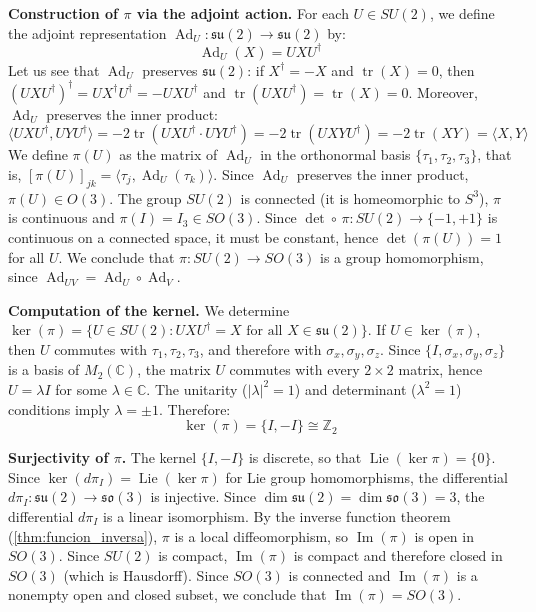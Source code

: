 \begin{example}
\textbf{Construction of $\pi$ via the adjoint action.}
For each $U \in SU(2)$, we define the adjoint representation $\operatorname{Ad}_U: \mathfrak{su}(2) \to \mathfrak{su}(2)$ by:
\begin{equation}\label{eq:adjoint_su2}
	\operatorname{Ad}_U(X) = UXU^\dagger
\end{equation}
Let us see that $\operatorname{Ad}_U$ preserves $\mathfrak{su}(2)$: if $X^\dagger = -X$ and $\operatorname{tr}(X) = 0$, then $(UXU^\dagger)^\dagger = UX^\dagger U^\dagger = -UXU^\dagger$ and $\operatorname{tr}(UXU^\dagger) = \operatorname{tr}(X) = 0$. Moreover, $\operatorname{Ad}_U$ preserves the inner product:
\[
	\langle UXU^\dagger, UYU^\dagger \rangle = -2\operatorname{tr}(UXU^\dagger \cdot UYU^\dagger) = -2\operatorname{tr}(UXYU^\dagger) = -2\operatorname{tr}(XY) = \langle X, Y \rangle
\]
We define $\pi(U)$ as the matrix of $\operatorname{Ad}_U$ in the orthonormal basis $\{\tau_1, \tau_2, \tau_3\}$, that is, $[\pi(U)]_{jk} = \langle \tau_j, \operatorname{Ad}_U(\tau_k) \rangle$. Since $\operatorname{Ad}_U$ preserves the inner product, $\pi(U) \in O(3)$. The group $SU(2)$ is connected (it is homeomorphic to $S^3$), $\pi$ is continuous and $\pi(I) = I_3 \in SO(3)$. Since $\det \circ\, \pi: SU(2) \to \{-1, +1\}$ is continuous on a connected space, it must be constant, hence $\det(\pi(U)) = 1$ for all $U$. We conclude that $\pi: SU(2) \to SO(3)$ is a group homomorphism, since $\operatorname{Ad}_{UV} = \operatorname{Ad}_U \circ \operatorname{Ad}_V$.

\textbf{Computation of the kernel.}
We determine $\ker(\pi) = \{U \in SU(2) : UXU^\dagger = X \text{ for all } X \in \mathfrak{su}(2)\}$. If $U \in \ker(\pi)$, then $U$ commutes with $\tau_1, \tau_2, \tau_3$, and therefore with $\sigma_x, \sigma_y, \sigma_z$. Since $\{I, \sigma_x, \sigma_y, \sigma_z\}$ is a basis of $M_2(\mathbb{C})$, the matrix $U$ commutes with every $2 \times 2$ matrix, hence $U = \lambda I$ for some $\lambda \in \mathbb{C}$. The unitarity ($|\lambda|^2 = 1$) and determinant ($\lambda^2 = 1$) conditions imply $\lambda = \pm 1$. Therefore:
\begin{equation}\label{eq:kernel_pi}
	\ker(\pi) = \{I, -I\} \cong \mathbb{Z}_2
\end{equation}

\textbf{Surjectivity of $\pi$.}
The kernel $\{I, -I\}$ is discrete, so that $\operatorname{Lie}(\ker \pi) = \{0\}$. Since $\ker(d\pi_I) = \operatorname{Lie}(\ker \pi)$ for Lie group homomorphisms, the differential $d\pi_I: \mathfrak{su}(2) \to \mathfrak{so}(3)$ is injective. Since $\dim \mathfrak{su}(2) = \dim \mathfrak{so}(3) = 3$, the differential $d\pi_I$ is a linear isomorphism. By the inverse function theorem (\autoref{thm:funcion_inversa}), $\pi$ is a local diffeomorphism, so $\operatorname{Im}(\pi)$ is open in $SO(3)$. Since $SU(2)$ is compact, $\operatorname{Im}(\pi)$ is compact and therefore closed in $SO(3)$ (which is Hausdorff). Since $SO(3)$ is connected and $\operatorname{Im}(\pi)$ is a nonempty open and closed subset, we conclude that $\operatorname{Im}(\pi) = SO(3)$.


\end{example}
